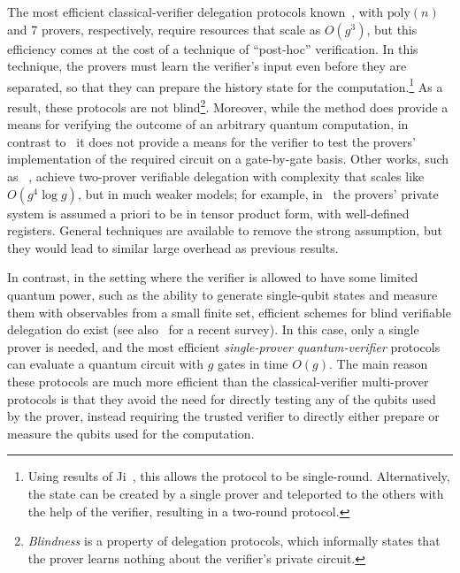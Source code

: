 \documentclass[11pt]{article}
\begin{document}
The most efficient classical-verifier delegation protocols known~\cite{hajdusek2015posthoc,natarajan2016robust}, with $\mathrm{poly}(n)$ and 7 provers, respectively,
require resources that scale as $O(g^3)$, but this efficiency comes at the cost of a technique of ``post-hoc''
verification. In this technique, the provers must learn the
verifier's input even before they are separated, so that they can prepare the
history state for the computation.\footnote{Using results of Ji~\cite{Ji16},
this allows the protocol to be single-round. Alternatively, the state can be created by a single prover and teleported to the others with the help of the verifier, resulting in a two-round protocol.} As a result, these protocols are not blind\footnote{
\emph{Blindness} is a property of delegation protocols, which informally states that the prover learns nothing about the verifier's private circuit.}. 
Moreover, while the method does provide a means for verifying the outcome
of an arbitrary quantum computation, in contrast
to~\cite{reichardt2012classical} it does not provide a means for the verifier to test the provers' implementation of the
required circuit on a gate-by-gate basis. 
Other works, such as ~\cite{HayashiH16},
achieve two-prover verifiable delegation with complexity that scales like $O(g^4\log g)$,  but in much weaker models; for example, in~\cite{HayashiH16} the provers' private system is assumed a priori to be in tensor product form, with well-defined registers.  General techniques are available to remove the strong assumption, but they would lead to similar large overhead as previous results.

In contrast, in the setting where the verifier is allowed to have some limited quantum power, such as the ability to generate single-qubit states and measure them with observables from a small finite set, efficient schemes for blind verifiable delegation do exist \cite{aharonov10qpip,fitzsimons12vubqc,Morimae14,broadbent15howtoverify,HayashiM15,MF16,FujiiH17,MorimaeTH17} (see also~\cite{fitzsimons2016survey} for a recent survey). In this case, only a single prover is needed, and the most efficient \emph{single-prover quantum-verifier} protocols can evaluate a quantum circuit with $g$ gates in time $O(g)$. The main reason these protocols are much more efficient than the classical-verifier multi-prover protocols is that they avoid the need for directly testing any of the qubits used by the prover, instead requiring the trusted verifier to directly either prepare or measure the qubits used for the computation. 
\end{document}
